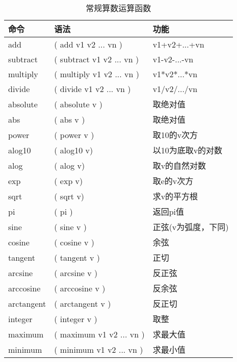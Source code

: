\begin{table}[!ht]
\centering
\ttfamily
\small
\caption{常规算数运算函数}
\label{table:regular-arithmetic-functions}
\begin{tabular}{lll}
    \toprule
    命令    &   语法    &   功能    \\
    \midrule
    add     &   ( add v1 v2 ... vn )        &   v1+v2+...+vn    \\
    subtract&   ( subtract v1 v2 ... vn )   &   v1-v2-...-vn    \\
    multiply&   ( multiply v1 v2 ... vn )   &   v1*v2*...*vn    \\
    divide  &   ( divide v1 v2 ... vn )     &   v1/v2/.../vn    \\
    absolute&   ( absolute v )              &   取绝对值    \\
    abs     &   ( abs v )                   &   取绝对值    \\
    power   &   ( power v )                 &   取10的v次方     \\
    alog10  &   ( alog10 v)                 &   以10为底取v的对数   \\
    alog    &   ( alog v)                   &   取v的自然对数   \\
    exp     &   ( exp v)                    &   取e的v次方  \\
    sqrt    &   ( sqrt v)                   &   求v的平方根 \\
    pi      &   ( pi )                      &   返回pi值    \\
    sine    &   ( sine v )                  &   正弦(v为弧度，下同)\\
    cosine  &   ( cosine v )                &   余弦    \\
    tangent &   ( tangent v )               &   正切    \\
    arcsine &   ( arcsine v )               &   反正弦  \\
    arccosine&  ( arccosine v )             &   反余弦  \\
    arctangent& ( arctangent v )            &   反正切  \\
    integer &   ( integer v )               &   取整    \\
    maximum &   ( maximum v1 v2 ... vn )    &   求最大值    \\
    minimum &   ( minimum v1 v2 ... vn )    &   求最小值    \\
    \bottomrule
\end{tabular}
\end{table}

